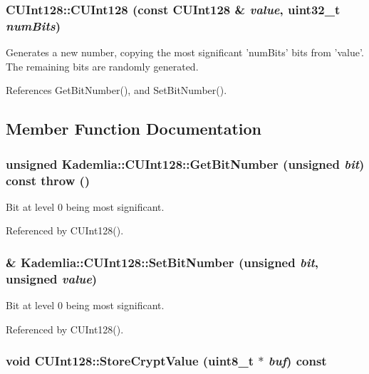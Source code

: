 \subsubsection[{CUInt128}]{\setlength{\rightskip}{0pt plus 5cm}CUInt128::CUInt128 (const {\bf CUInt128} \& {\em value}, \/  uint32\_\-t {\em numBits})}\label{classKademlia_1_1CUInt128_aadcc67293c0fc59b9a4433b1cff44a90}


Generates a new number, copying the most significant 'numBits' bits from 'value'. The remaining bits are randomly generated. 

References GetBitNumber(), and SetBitNumber().

\subsection{Member Function Documentation}
\subsubsection[{GetBitNumber}]{\setlength{\rightskip}{0pt plus 5cm}unsigned Kademlia::CUInt128::GetBitNumber (unsigned {\em bit}) const  throw ()\hspace{0.3cm}{\ttfamily  [inline]}}\label{classKademlia_1_1CUInt128_ae3636582f775caa8268b8e2c9f165d7b}


Bit at level 0 being most significant. 

Referenced by CUInt128().
\subsubsection[{SetBitNumber}]{\& Kademlia::CUInt128::SetBitNumber (unsigned {\em bit}, \/  unsigned {\em value})\hspace{0.3cm}{\ttfamily  [inline]}}\label{classKademlia_1_1CUInt128_aaa950c54254deceab46863b68cff7f80}


Bit at level 0 being most significant. 

Referenced by CUInt128().
\subsubsection[{StoreCryptValue}]{\setlength{\rightskip}{0pt plus 5cm}void CUInt128::StoreCryptValue (uint8\_\-t $\ast$ {\em buf}) const}\label{classKademlia_1_1CUInt128_aed4d0dc84ddb695abb48a84b2f968bbb}


